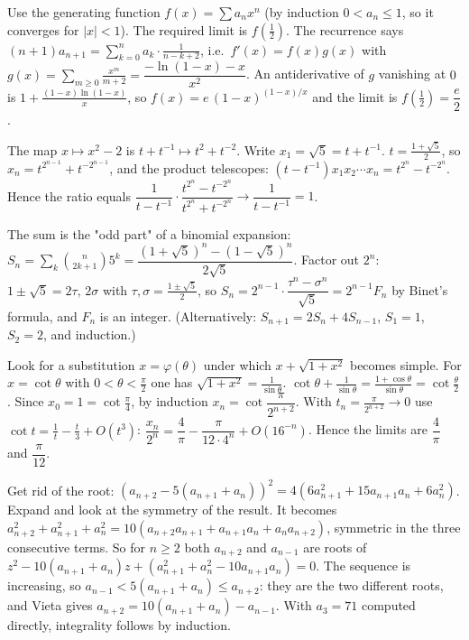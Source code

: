 \documentclass[11pt,a4paper]{article}
\begin{document}
 Use the generating function $f(x)=\sum a_nx^n$ (by induction $0<a_n\le1$, so it converges for $|x|<1$). The required limit is $f(\frac12)$.
 The recurrence says $(n+1)a_{n+1}=\sum_{k=0}^n a_k\cdot\frac1{n-k+2}$, i.e.\ $f'(x)=f(x)g(x)$ with $g(x)=\sum_{m\ge0}\frac{x^m}{m+2}=\dfrac{-\ln(1-x)-x}{x^2}$.
 An antiderivative of $g$ vanishing at $0$ is $1+\frac{(1-x)\ln(1-x)}{x}$, so $f(x)=e\,(1-x)^{(1-x)/x}$ and the limit is $f(\frac12)=\dfrac e2$.

 The map $x\mapsto x^2-2$ is $t+t^{-1}\mapsto t^2+t^{-2}$. Write $x_1=\sqrt5=t+t^{-1}$.
 $t=\frac{1+\sqrt5}2$, so $x_n=t^{2^{n-1}}+t^{-2^{n-1}}$, and the product telescopes: $(t-t^{-1})x_1x_2\cdots x_n=t^{2^n}-t^{-2^n}$.
 Hence the ratio equals $\dfrac{1}{t-t^{-1}}\cdot\dfrac{t^{2^n}-t^{-2^n}}{t^{2^n}+t^{-2^n}}\to\dfrac1{t-t^{-1}}=1$.

 The sum is the "odd part" of a binomial expansion: $S_n=\sum_k\binom n{2k+1}5^k=\dfrac{(1+\sqrt5)^n-(1-\sqrt5)^n}{2\sqrt5}$.
 Factor out $2^n$: $1\pm\sqrt5=2\tau,\,2\sigma$ with $\tau,\sigma=\frac{1\pm\sqrt5}2$, so $S_n=2^{n-1}\cdot\dfrac{\tau^n-\sigma^n}{\sqrt5}=2^{n-1}F_n$ by Binet's formula, and $F_n$ is an integer. (Alternatively: $S_{n+1}=2S_n+4S_{n-1}$, $S_1=1$, $S_2=2$, and induction.)

 Look for a substitution $x=\varphi(\theta)$ under which $x+\sqrt{1+x^2}$ becomes simple. For $x=\cot\theta$ with $0<\theta<\frac\pi2$ one has $\sqrt{1+x^2}=\frac1{\sin\theta}$.
 $\cot\theta+\frac1{\sin\theta}=\frac{1+\cos\theta}{\sin\theta}=\cot\frac\theta2$. Since $x_0=1=\cot\frac\pi4$, by induction $x_n=\cot\dfrac{\pi}{2^{n+2}}$.
 With $t_n=\frac\pi{2^{n+2}}\to0$ use $\cot t=\frac1t-\frac t3+O(t^3)$: $\dfrac{x_n}{2^n}=\dfrac4\pi-\dfrac{\pi}{12\cdot4^n}+O(16^{-n})$. Hence the limits are $\dfrac4\pi$ and $\dfrac\pi{12}$.

 Get rid of the root: $(a_{n+2}-5(a_{n+1}+a_n))^2=4(6a_{n+1}^2+15a_{n+1}a_n+6a_n^2)$. Expand and look at the symmetry of the result.
 It becomes $a_{n+2}^2+a_{n+1}^2+a_n^2=10(a_{n+2}a_{n+1}+a_{n+1}a_n+a_na_{n+2})$, symmetric in the three consecutive terms. So for $n\ge2$ both $a_{n+2}$ and $a_{n-1}$ are roots of $z^2-10(a_{n+1}+a_n)z+(a_{n+1}^2+a_n^2-10a_{n+1}a_n)=0$.
 The sequence is increasing, so $a_{n-1}<5(a_{n+1}+a_n)\le a_{n+2}$: they are the two different roots, and Vieta gives $a_{n+2}=10(a_{n+1}+a_n)-a_{n-1}$. With $a_3=71$ computed directly, integrality follows by induction.
\end{document}

